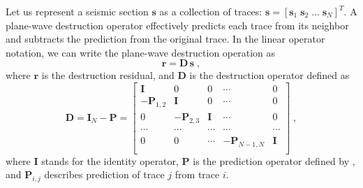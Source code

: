 Let us represent a seismic section $\mathbf{s}$ as a collection of
traces: $\mathbf{s} = \left[\mathbf{s}_1 \; \mathbf{s}_2 \; \ldots \;
\mathbf{s}_N\right]^T$. A plane-wave destruction operator
\cite[]{GEO67-06-19461960} effectively predicts each trace from its
neighbor and subtracts the prediction from the original trace. In the
linear operator notation, we can write the plane-wave destruction
operation as
\begin{equation}
  \label{eq:pwd}
  \mathbf{r} = \mathbf{D\,s}\;,
\end{equation}
where $\mathbf{r}$ is the destruction residual, and $\mathbf{D}$ is the
destruction operator defined as
\begin{equation}
  \label{eq:d}
  \mathbf{D} = \mathbf{I}_N - \mathbf{P} =
  \left[\begin{array}{ccccc}
      \mathbf{I} & 0 & 0 & \cdots & 0 \\
      - \mathbf{P}_{1,2} & \mathbf{I} & 0 & \cdots & 0 \\
      0 & - \mathbf{P}_{2,3} & \mathbf{I} & \cdots & 0 \\
      \cdots & \cdots & \cdots & \cdots & \cdots \\
      0 & 0 & \cdots & - \mathbf{P}_{N-1,N} & \mathbf{I} \\
    \end{array}\right]\;,
\end{equation}
where $\mathbf{I}$ stands for the identity operator, $\mathbf{P}$ is
the prediction operator defined by \cite{GEO67-06-19461960}, and
$\mathbf{P}_{i,j}$ describes prediction of trace $j$ from trace
$i$. 

